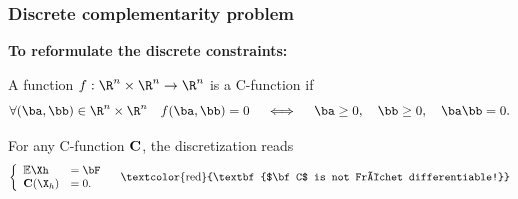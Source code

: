 \documentclass[10 pt]{beamer}
\begin{document}
\begin{frame}
\frametitle{Discrete complementarity problem}
\alert{\textbf{To reformulate the discrete constraints:}}
\begin{definition}
A function $f: {{\R}^n \times \R^n} \rightarrow \R^n$ is a C-function if
\begin{equation*}
\forall(\ba,\bb)\in {\R}^n \times \R^n \quad f(\ba,\bb)=0 \quad \iff \quad
\ba \geq0, \quad \bb \geq0, \quad \ba \bb=0.
\end{equation*}
\end{definition}
For any C-function ${\bf C}$, the discretization reads 
\begin{equation*}
\left\lbrace\begin{array}{llccc}
 \mathbb{E}\Xh &= \bF\\
{\bf C}(\X_h)&=0.
\end{array}
\right.
\quad \mbox{\textcolor{red}{\textbf{$\bf C$ is not Fréchet differentiable!}}}
\end{equation*}


\end{frame}
\end{document}
